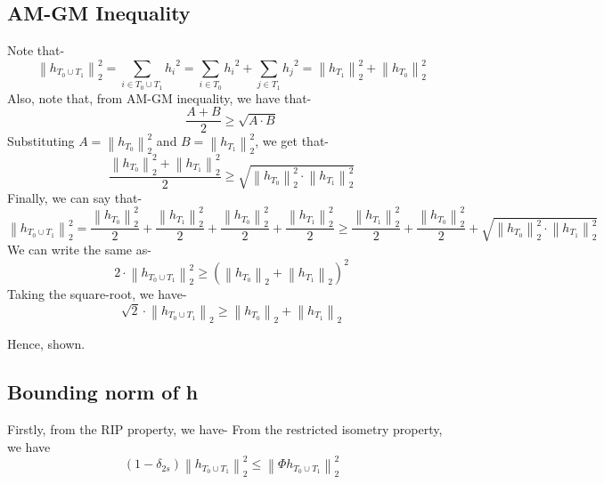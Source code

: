 \documentclass[a4paper,11pt]{article}
\numberwithin{definition}{section}
\numberwithin{mytheorem}{subsection}
\newcommand\norm[1]{\left\lVert#1\right\rVert}
\begin{document}
\subsection{AM-GM Inequality}
\label{amgm}
Note that-
$$\norm{h_{T_0 \cup T_1}}^2_2 = \sum_{i \in T_0\cup T_1} {h_i}^2 = \sum_{i \in T_0} {h_i}^2 + \sum_{j \in T_1} {h_j}^2 = \norm{h_{T_1}}^2_2 + \norm{h_{T_0}}^2_2$$
Also, note that, from AM-GM inequality, we have that-
$$\frac{A+B}{2} \geq \sqrt{A\cdot B}$$
Substituting $A = \norm{h_{T_0}}^2_2$ and $B = \norm{h_{T_1}}^2_2$, we get that-
$$\frac{\norm{h_{T_0}}^2_2+\norm{h_{T_1}}^2_2}{2} \geq \sqrt{\norm{h_{T_0}}^2_2\cdot \norm{h_{T_1}}^2_2}$$
Finally, we can say that-
$$\norm{h_{T_0 \cup T_1}}^2_2 = \frac{\norm{h_{T_0}}^2_2}{2}  + \frac{\norm{h_{T_1}}^2_2}{2}  + \frac{\norm{h_{T_0}}^2_2}{2} + \frac{\norm{h_{T_1}}^2_2}{2} \geq \frac{\norm{h_{T_1}}^2_2}{2} + \frac{\norm{h_{T_0}}^2_2}{2} + \sqrt{\norm{h_{T_0}}^2_2\cdot \norm{h_{T_1}}^2_2}$$
We can write the same as-
$$2 \cdot \norm{h_{T_0 \cup T_1}}^2_2 \geq (\norm{h_{T_0}}_2 + \norm{h_{T_1}}_2)^{2}$$
Taking the square-root, we have-
$$\sqrt{2} \cdot \norm{h_{T_0 \cup T_1}}_2 \geq \norm{h_{T_0}}_2 + \norm{h_{T_1}}_2$$

Hence, shown.

\subsection{Bounding norm of \textbf{h}}

Firstly, from the RIP property, we have-
From the restricted isometry property, we have
$$(1 - \delta_{2s}) \norm{h_{T_0 \cup T_1}}_2^2 \leq \norm{\Phi h_{T_0 \cup T_1}}_2^2$$
\end{document}
